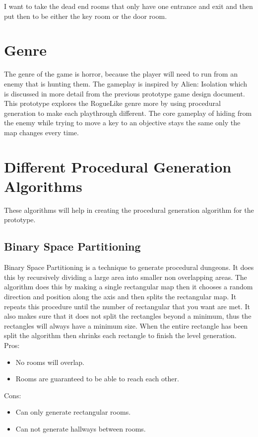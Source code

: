 \documentclass{article}
\begin{document}
I want to take the dead end rooms that only have one entrance and exit and then put then to be either the 
key room or the door room.

\section*{Genre}
The genre of the game is horror, because the player will need to run from an enemy that is hunting them.
The gameplay is inspired by Alien: Isolation which is discussed in more detail from the previous prototype
game design document. 
This prototype explores the RogueLike genre more by using procedural generation to make each playthrough 
different. The core gameplay of hiding from the enemy while trying to move a key to an objective stays the
same only the map changes every time.

\section*{Different Procedural Generation Algorithms}
These algorithms will help in creating the procedural generation algorithm for the prototype.
\subsection*{Binary Space Partitioning}
Binary Space Partitioning is a technique to generate procedural dungeons. It does this by
recursively dividing a large area into smaller non overlapping areas. 
The algorithm does this by making a single rectangular map then it chooses a random direction
and position along the axis and then splits the rectangular map. It repeats this procedure
until the number of rectangular that you want are met. It also makes sure that it does not
split the rectangles beyond a minimum, thus the rectangles will always have a minimum size.
When the entire rectangle has been split the algorithm then shrinks each rectangle to finish
the level generation.
Pros:
\begin{itemize}
    \item No rooms will overlap.
    \item Rooms are guaranteed to be able to reach each other.
\end{itemize}
Cons:
\begin{itemize}
    \item Can only generate rectangular rooms.
    \item Can not generate hallways between rooms.
\end{itemize}
\end{document}
